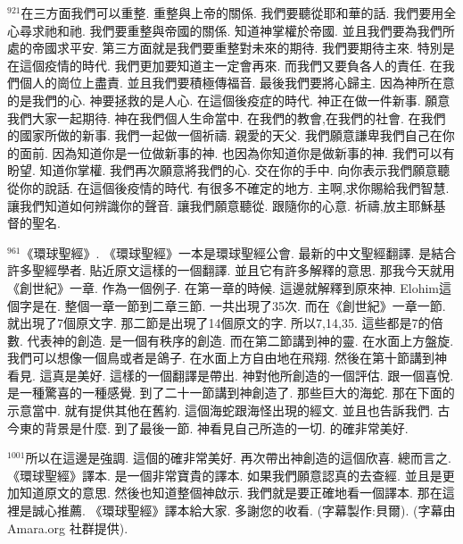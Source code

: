 \documentclass{book}
\begin{document}
$^{921}$在三方面我們可以重整.
重整與上帝的關係.
我們要聽從耶和華的話.
我們要用全心尋求祂和祂.
我們要重整與帝國的關係.
知道神掌權於帝國.
並且我們要為我們所處的帝國求平安.
第三方面就是我們要重整對未來的期待.
我們要期待主來.
特別是在這個疫情的時代.
我們更加要知道主一定會再來.
而我們又要負各人的責任.
在我們個人的崗位上盡責.
並且我們要積極傳福音.
最後我們要將心歸主.
因為神所在意的是我們的心.
神要拯救的是人心.
在這個後疫症的時代.
神正在做一件新事.
願意我們大家一起期待.
神在我們個人生命當中.
在我們的教會,在我們的社會.
在我們的國家所做的新事.
我們一起做一個祈禱.
親愛的天父.
我們願意謙卑我們自己在你的面前.
因為知道你是一位做新事的神.
也因為你知道你是做新事的神.
我們可以有盼望.
知道你掌權.
我們再次願意將我們的心.
交在你的手中.
向你表示我們願意聽從你的說話.
在這個後疫情的時代.
有很多不確定的地方.
主啊,求你賜給我們智慧.
讓我們知道如何辨識你的聲音.
讓我們願意聽從.
跟隨你的心意.
祈禱,放主耶穌基督的聖名.

$^{961}$《環球聖經》.
《環球聖經》一本是環球聖經公會.
最新的中文聖經翻譯.
是結合許多聖經學者.
貼近原文這樣的一個翻譯.
並且它有許多解釋的意思.
那我今天就用《創世紀》一章.
作為一個例子.
在第一章的時候.
這邊就解釋到原來神.
Elohim這個字是在.
整個一章一節到二章三節.
一共出現了35次.
而在《創世紀》一章一節.
就出現了7個原文字.
那二節是出現了14個原文的字.
所以7,14,35.
這些都是7的倍數.
代表神的創造.
是一個有秩序的創造.
而在第二節講到神的靈.
在水面上方盤旋.
我們可以想像一個鳥或者是鴿子.
在水面上方自由地在飛翔.
然後在第十節講到神看見.
這真是美好.
這樣的一個翻譯是帶出.
神對他所創造的一個評估.
跟一個喜悅.
是一種驚喜的一種感覺.
到了二十一節講到神創造了.
那些巨大的海蛇.
那在下面的示意當中.
就有提供其他在舊約.
這個海蛇跟海怪出現的經文.
並且也告訴我們.
古今東的背景是什麼.
到了最後一節.
神看見自己所造的一切.
的確非常美好.

$^{1001}$所以在這邊是強調.
這個的確非常美好.
再次帶出神創造的這個欣喜.
總而言之.
《環球聖經》譯本.
是一個非常寶貴的譯本.
如果我們願意認真的去查經.
並且是更加知道原文的意思.
然後也知道整個神啟示.
我們就是要正確地看一個譯本.
那在這裡是誠心推薦.
《環球聖經》譯本給大家.
多謝您的收看.
(字幕製作:貝爾).
(字幕由 Amara.org 社群提供).
\newpage
\end{document}
